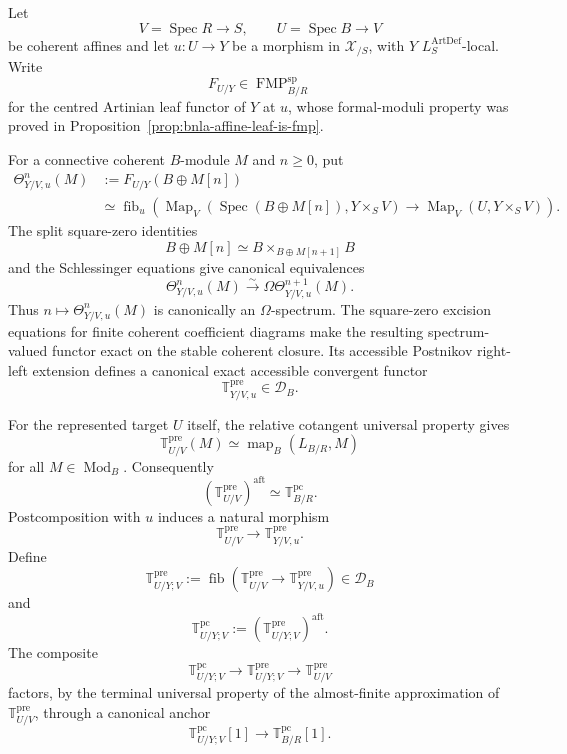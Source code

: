 \begin{construction}
\label{con:bnla-coherent-pre-tangent}
Let
\[
    V=\operatorname{Spec}R\longrightarrow S,
    \qquad
    U=\operatorname{Spec}B\longrightarrow V
\]
be coherent affines and let $u:U\to Y$ be a morphism in
$\mathcal X_{/S}$, with $Y$ $L_S^{\mathrm{ArtDef}}$-local.  Write
\[
    F_{U/Y}\in\operatorname{FMP}^{\mathrm{sp}}_{B/R}
\]
for the centred Artinian leaf functor of $Y$ at $u$, whose formal-moduli
property was proved in Proposition~\ref{prop:bnla-affine-leaf-is-fmp}.

For a connective coherent $B$-module $M$ and $n\geq0$, put
\[
\begin{aligned}
    \Theta^n_{Y/V,u}(M)
    &:=F_{U/Y}(B\oplus M[n])\\
    &\simeq
    \operatorname{fib}_{u}
    \left(
        \operatorname{Map}_V
        \left(\operatorname{Spec}(B\oplus M[n]),Y\times_SV\right)
        \longrightarrow
        \operatorname{Map}_V(U,Y\times_SV)
    \right).
\end{aligned}
\]
The split square-zero identities
\[
    B\oplus M[n]
    \simeq
    B\times_{B\oplus M[n+1]}B
\]
and the Schlessinger equations give canonical equivalences
\[
    \Theta^n_{Y/V,u}(M)
    \xrightarrow{\sim}
    \Omega\Theta^{n+1}_{Y/V,u}(M).
\]
Thus $n\mapsto\Theta^n_{Y/V,u}(M)$ is canonically an $\Omega$-spectrum.
The square-zero excision equations for finite coherent coefficient diagrams
make the resulting spectrum-valued functor exact on the stable coherent
closure.  Its accessible Postnikov right-left extension defines a canonical
exact accessible convergent functor
\[
\boxed{
    \mathbb T^{\mathrm{pre}}_{Y/V,u}
    \in\mathcal D_B.}
\]

For the represented target $U$ itself, the relative cotangent universal
property gives
\[
\boxed{
    \mathbb T^{\mathrm{pre}}_{U/V}(M)
    \simeq
    \operatorname{map}_B(L_{B/R},M)}
\]
for all $M\in\operatorname{Mod}_B$.  Consequently
\[
\boxed{
    \left(\mathbb T^{\mathrm{pre}}_{U/V}\right)^{\mathrm{aft}}
    \simeq
    \mathbb T^{\mathrm{pc}}_{B/R}.}
\]
Postcomposition with $u$ induces a natural morphism
\[
    \mathbb T^{\mathrm{pre}}_{U/V}
    \longrightarrow
    \mathbb T^{\mathrm{pre}}_{Y/V,u}.
\]
Define
\[
    \mathbb T^{\mathrm{pre}}_{U/Y;V}
    :=
    \operatorname{fib}
    \left(
        \mathbb T^{\mathrm{pre}}_{U/V}
        \longrightarrow
        \mathbb T^{\mathrm{pre}}_{Y/V,u}
    \right)
    \in\mathcal D_B
\]
and
\[
\boxed{
    \mathbb T^{\mathrm{pc}}_{U/Y;V}
    :=
    \left(\mathbb T^{\mathrm{pre}}_{U/Y;V}\right)^{\mathrm{aft}}.}
\]
The composite
\[
    \mathbb T^{\mathrm{pc}}_{U/Y;V}
    \longrightarrow
    \mathbb T^{\mathrm{pre}}_{U/Y;V}
    \longrightarrow
    \mathbb T^{\mathrm{pre}}_{U/V}
\]
factors, by the terminal universal property of the almost-finite
approximation of $\mathbb T^{\mathrm{pre}}_{U/V}$, through a canonical anchor
\[
\boxed{
    \mathbb T^{\mathrm{pc}}_{U/Y;V}[1]
    \longrightarrow
    \mathbb T^{\mathrm{pc}}_{B/R}[1].}
\]
\end{construction}

